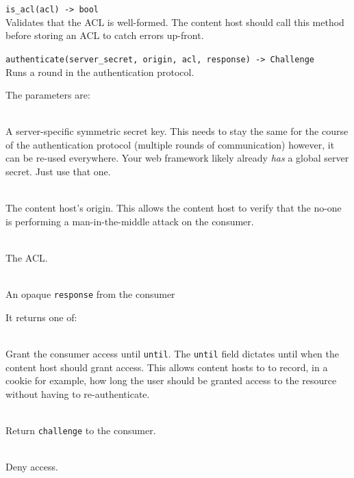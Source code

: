 \documentclass[pdftex,12pt,a4papaer,twoside,notitlepage]{report}
\begin{document}
\begin{compactitem}[$\lambda$]
\item \verb=is_acl(acl) -> bool= \\
  Validates that the ACL is well-formed. The content host should call this
  method before storing an ACL to catch errors up-front.
\item \verb=authenticate(server_secret, origin, acl, response) -> Challenge= \\
  Runs a round in the authentication protocol.

  The parameters are:

  \begin{description}[labelindent=2em,leftmargin=4em]
  \item[\texttt{server\_secret}] \hfill \\
    A server-specific symmetric secret key. This needs to stay the same for the
    course of the authentication protocol (multiple rounds of communication)
    however, it can be re-used everywhere. Your web framework likely already
    \emph{has} a global server secret. Just use that one.
  \item[\texttt{origin}] \hfill \\
    The content host's origin. This allows the content host to verify that the
    no-one is performing a man-in-the-middle attack on the consumer.
  \item[\texttt{acl}] \hfill \\
    The ACL.
  \item[\texttt{response}] \hfill \\
    An opaque \texttt{response} from the consumer
  \end{description}

  It returns one of:

 \begin{description}[labelindent=2em,leftmargin=4em]
 \item[\texttt{Grant(until)}] \hfill \\
   Grant the consumer access until \texttt{until}. The \texttt{until} field
   dictates until when the content host should grant access. This allows content
   hosts to to record, in a cookie for example, how long the user should be
   granted access to the resource without having to re-authenticate.
 \item[\texttt{Continue(challenge)}] \hfill \\
   Return \texttt{challenge} to the consumer.
 \item[\texttt{Deny}] \hfill \\
   Deny access.
 \end{description}
\end{compactitem}
\end{document}
